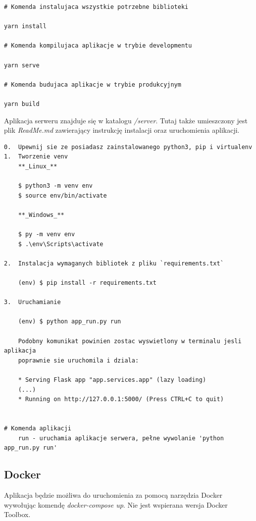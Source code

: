 \documentclass[12pt,a4paper]{article} %
\begin{document}
        \begin{lstlisting}[caption={Komendy budujące aplikacje klienta}, label={zad1}, captionpos=t]
# Komenda instalujaca wszystkie potrzebne biblioteki

yarn install

# Komenda kompilujaca aplikacje w trybie developmentu

yarn serve

# Komenda budujaca aplikacje w trybie produkcyjnym

yarn build
        \end{lstlisting}
        Aplikacja serweru znajduje się w katalogu \textit{/server}. Tutaj także umieszczony jest plik \textit{ReadMe.md} zawierający instrukcję instalacji oraz uruchomienia aplikacji.\\
\newpage
        \begin{lstlisting}[caption={Komendy budujące aplikacje serwera}, label={zad1}, captionpos=t]
0.  Upewnij sie ze posiadasz zainstalowanego python3, pip i virtualenv
1.  Tworzenie venv  
    **_Linux_**  
    
    $ python3 -m venv env
    $ source env/bin/activate
    
    **_Windows_**  
    
    $ py -m venv env
    $ .\env\Scripts\activate
    
2.  Instalacja wymaganych bibliotek z pliku `requirements.txt`  
    
    (env) $ pip install -r requirements.txt
    
3.  Uruchamianie  
    
    (env) $ python app_run.py run
    
    Podobny komunikat powinien zostac wyswietlony w terminalu jesli aplikacja 
    poprawnie sie uruchomila i dziala:
    
    * Serving Flask app "app.services.app" (lazy loading)
    (...)
    * Running on http://127.0.0.1:5000/ (Press CTRL+C to quit)


# Komenda aplikacji
    run - uruchamia aplikacje serwera, pełne wywolanie 'python app_run.py run'

        \end{lstlisting}
    \subsection{Docker}
    Aplikacja będzie możliwa do uruchomienia za pomocą narzędzia Docker wywołując komendę \textit{docker-compose up}. Nie jest wspierana wersja Docker Toolbox.
\end{document}
